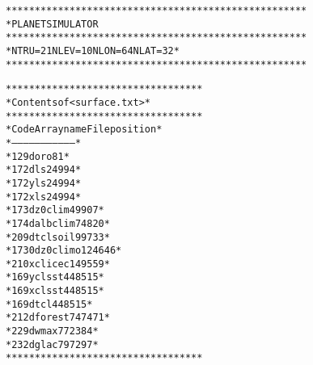 \begin{alltt}

 ****************************************************
 * PLANET SIMULATOR     
 ****************************************************
 * NTRU =  21  NLEV =  10  NLON =   64   NLAT =  32 *
 ****************************************************

 **********************************
 * Contents of <surface.txt>      *
 **********************************
 * Code Array name  File position *
 *--------------------------------*
 *  129 doro                   81 *
 *  172 dls                 24994 *
 *  172 yls                 24994 *
 *  172 xls                 24994 *
 *  173 dz0clim             49907 *
 *  174 dalbclim            74820 *
 *  209 dtclsoil            99733 *
 * 1730 dz0climo           124646 *
 *  210 xclicec            149559 *
 *  169 yclsst             448515 *
 *  169 xclsst             448515 *
 *  169 dtcl               448515 *
 *  212 dforest            747471 *
 *  229 dwmax              772384 *
 *  232 dglac              797297 *
 **********************************


\end{alltt}
